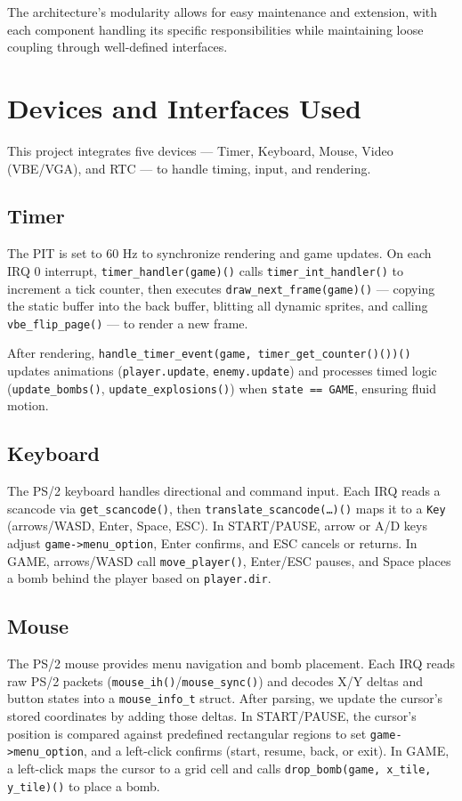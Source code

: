 \documentclass[12pt,a4paper]{article}
\newcommand{\func}[1]{\texttt{#1()}}
\newcommand{\var}[1]{\texttt{#1}}
\newcommand{\struct}[1]{\texttt{#1}}
\begin{document}
The architecture's modularity allows for easy maintenance and extension, with each component handling its specific responsibilities while maintaining loose coupling through well-defined interfaces.

\section{Devices and Interfaces Used}
This project integrates five devices --- Timer, Keyboard, Mouse, Video (VBE/VGA), and RTC --- to handle timing, input, and rendering.

\subsection{Timer}

The PIT is set to 60 Hz to synchronize rendering and game updates. On each IRQ 0 interrupt, \func{timer\_handler(game)} calls \func{timer\_int\_handler} to increment a tick counter, then executes \func{draw\_next\_frame(game)} --- copying the static buffer into the back buffer, blitting all dynamic sprites, and calling \func{vbe\_flip\_page} --- to render a new frame.

After rendering, \func{handle\_timer\_event(game, \func{timer\_get\_counter()})} updates animations (\var{player.update}, \var{enemy.update}) and processes timed logic (\func{update\_bombs}, \func{update\_explosions}) when \var{state == GAME}, ensuring fluid motion.

\subsection{Keyboard}

The PS/2 keyboard handles directional and command input. Each IRQ reads a scancode via \func{get\_scancode}, then \func{translate\_scancode(\dots)} maps it to a \var{Key} (arrows/WASD, Enter, Space, ESC). In START/PAUSE, arrow or A/D keys adjust \var{game->menu\_option}, Enter confirms, and ESC cancels or returns. In GAME, arrows/WASD call \func{move\_player}, Enter/ESC pauses, and Space places a bomb behind the player based on \var{player.dir}.

\subsection{Mouse}

The PS/2 mouse provides menu navigation and bomb placement. Each IRQ reads raw PS/2 packets (\func{mouse\_ih}/\func{mouse\_sync}) and decodes X/Y deltas and button states into a \struct{mouse\_info\_t} struct. After parsing, we update the cursor's stored coordinates by adding those deltas. In START/PAUSE, the cursor's position is compared against predefined rectangular regions to set \var{game->menu\_option}, and a left-click confirms (start, resume, back, or exit). In GAME, a left-click maps the cursor to a grid cell and calls \func{drop\_bomb(game, x\_tile, y\_tile)} to place a bomb.
\end{document}
